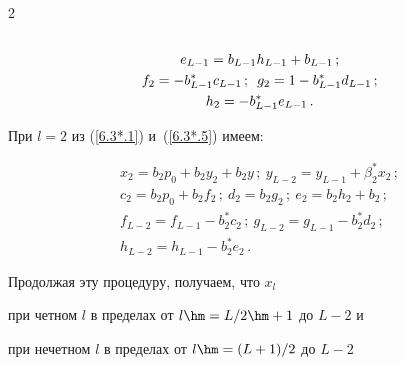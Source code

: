 \begin{multicols}{2}
\begin{gather*}
\\


e_{L-1}=b_{L-1} h_{L-1} + b_{L-1}\,;


\\


f_{2} = - b^*_{L-1} c_{L-1}\,;


\enskip


g_{2}=1 - b^*_{L-1} d_{L-1}\,;


\\


h_{2}=- b^*_{L-1} e_{L-1}\,.


\end{gather*}


При $l=2$ из (\ref{6.3*.1}) и~(\ref{6.3*.5}) имеем:





\noindent




\begin{gather*}


x_{2} = b_{2} p_0 + b_{2} y_2 + b_{2} y\,;


\


y_{L-2} = y_{L-1} + \beta^*_{2} x_{2} \,;


\\


c_{2} =b_{2} p_0 + b_{2} f_{2} \,;


\ 


d_{2} = b_{2} g_{2}\,;


\


e_{2} = b_{2} h_{2} + b_{2}\,;


\\


f_{L-2} = f_{L-1} - b^*_{2} c_{2}\,;


\ 


g_{L-2} = g_{L-1} - b^*_{2} d_{2}\,;


\\


h_{L-2} = h_{L-1} - b^*_{2} e_{2} \,.


\end{gather*}





Продолжая эту процедуру, получаем, что $x_l$


при четном $l$ в пределах от $l\hm=L/2\hm+1$ до $L-2$ и


при нечетном $l$ в пределах от $l\hm=(L+1)/2$ до $L-2$



\end{multicols}
